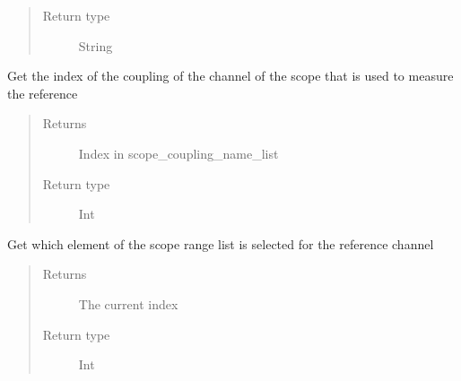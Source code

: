 \documentclass[letterpaper,10pt,english]{sphinxmanual}
\begin{document}
\begin{fulllineitems}
\begin{fulllineitems}
\begin{quote}
\begin{description}
\item[{Return type}] \leavevmode
\sphinxAtStartPar
String

\end{description}\end{quote}

\end{fulllineitems}


\begin{fulllineitems}
\label{\detokenize{index:TiePieLCR_settings.TiePieLCR_settings.get_reference_scope_coupling}}
\sphinxAtStartPar
Get the index of the coupling of the channel of the scope that is used to measure the reference
\begin{quote}\begin{description}
\item[{Returns}] \leavevmode
\sphinxAtStartPar
Index in scope\_coupling\_name\_list

\item[{Return type}] \leavevmode
\sphinxAtStartPar
Int

\end{description}\end{quote}

\end{fulllineitems}


\begin{fulllineitems}
\label{\detokenize{index:TiePieLCR_settings.TiePieLCR_settings.get_reference_scope_range_index}}
\sphinxAtStartPar
Get which element of the scope range list is selected for the reference channel
\begin{quote}\begin{description}
\item[{Returns}] \leavevmode
\sphinxAtStartPar
The current index

\item[{Return type}] \leavevmode
\sphinxAtStartPar
Int


\end{description}
\end{quote}
\end{fulllineitems}
\end{fulllineitems}
\end{document}
